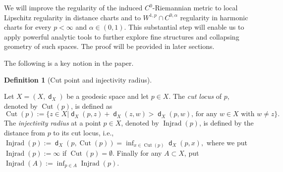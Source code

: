 \documentclass[11pt,reqno]{amsart}
\theoremstyle{definition}
\newtheorem{definition}[theorem]{Definition}
\numberwithin{equation}{section}
\DeclareMathOperator{\Cut}{Cut}
\DeclareMathOperator{\dist}{\mathsf{d}}
\DeclareMathOperator{\Injrad}{Injrad}
\begin{document}
We will improve the regularity of the induced $C^0$-Riemannian metric to local Lipschitz regularity in distance charts and to $W^{1,p}\cap C^{0,\alpha}$ regularity in harmonic charts for every $p<\infty$ and $\alpha\in(0,1)$.
 This substantial step will enable us to apply powerful analytic tools to further explore fine structures and collapsing geometry of such spaces.
The proof will be provided in later sections.


 



The following is a key notion in the paper.
\begin{definition}
[Cut point and injectivity radius]\label{definject} 
 
    Let $X=(X, \dist_X)$ be a geodesic space and let $p \in X$. 
  The \textit{cut locus} of $p$, denoted by $\Cut(p)$, is defined as
    \begin{equation}\label{cutlocusdef}
        \Cut(p) := \{z \in X| \dist_X (p, z)+\dist_X (z, w)>\dist_X (p,w), \, \text{for any $w \in X$ with $w \neq z$}\}.
    \end{equation}
 The \textit{injectivity radius} at a point $p \in X$, denoted by $\Injrad(p)$, is defined by the distance from $p$ to its cut locus, i.e., 
        $
            \Injrad(p) := \dist_X (p, \Cut(p))=\inf_{x \in \Cut(p)}\dist_X (p, x),
        $
        where we put $\Injrad(p) := \infty$ if $\Cut(p) = \emptyset$. Finally for any $A \subset X$, put
        $
            \Injrad(A):=\inf_{p \in A}\Injrad(p).
        $
 \end{definition}
\end{document}
